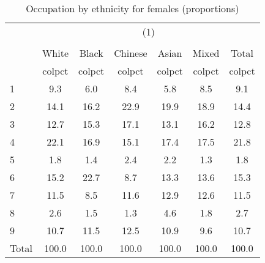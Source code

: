 \begin{table}[htbp]\centering
\def\sym#1{\ifmmode^{#1}\else\(^{#1}\)\fi}
\caption{Occupation by ethnicity for females (proportions)}
\begin{tabular}{l*{6}{c}}
\hline\hline
          &\multicolumn{6}{c}{(1)}                                    \\
          &\multicolumn{6}{c}{}                                       \\
          &    White&    Black&  Chinese&    Asian&    Mixed&    Total\\
          &   colpct&   colpct&   colpct&   colpct&   colpct&   colpct\\
\hline
1         &      9.3&      6.0&      8.4&      5.8&      8.5&      9.1\\
2         &     14.1&     16.2&     22.9&     19.9&     18.9&     14.4\\
3         &     12.7&     15.3&     17.1&     13.1&     16.2&     12.8\\
4         &     22.1&     16.9&     15.1&     17.4&     17.5&     21.8\\
5         &      1.8&      1.4&      2.4&      2.2&      1.3&      1.8\\
6         &     15.2&     22.7&      8.7&     13.3&     13.6&     15.3\\
7         &     11.5&      8.5&     11.6&     12.9&     12.6&     11.5\\
8         &      2.6&      1.5&      1.3&      4.6&      1.8&      2.7\\
9         &     10.7&     11.5&     12.5&     10.9&      9.6&     10.7\\
Total     &    100.0&    100.0&    100.0&    100.0&    100.0&    100.0\\
\hline\hline
\end{tabular}
\label{tab:occup_female}
\end{table}
